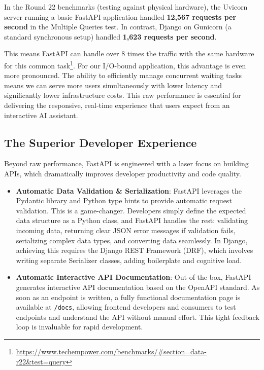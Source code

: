 In the Round 22 benchmarks (testing against physical hardware), the Uvicorn server running a basic FastAPI application handled \textbf{12,567 requests per second} in the Multiple Queries test. In contrast, Django on Gunicorn (a standard synchronous setup) handled \textbf{1,623 requests per second}.

This means FastAPI can handle over 8 times the traffic with the same hardware for this common task\footnote{\url{https://www.techempower.com/benchmarks/#section=data-r22&test=query}}. For our I/O-bound application, this advantage is even more pronounced. The ability to efficiently manage concurrent waiting tasks means we can serve more users simultaneously with lower latency and significantly lower infrastructure costs. This raw performance is essential for delivering the responsive, real-time experience that users expect from an interactive AI assistant.

\subsection{The Superior Developer Experience}
Beyond raw performance, FastAPI is engineered with a laser focus on building APIs, which dramatically improves developer productivity and code quality.

\begin{itemize}
    \item \textbf{Automatic Data Validation \& Serialization}: FastAPI leverages the Pydantic library and Python type hints to provide automatic request validation. This is a game-changer. Developers simply define the expected data structure as a Python class, and FastAPI handles the rest: validating incoming data, returning clear JSON error messages if validation fails, serializing complex data types, and converting data seamlessly. In Django, achieving this requires the Django REST Framework (DRF), which involves writing separate Serializer classes, adding boilerplate and cognitive load.
    \item \textbf{Automatic Interactive API Documentation}: Out of the box, FastAPI generates interactive API documentation based on the OpenAPI standard. As soon as an endpoint is written, a fully functional documentation page is available at \texttt{/docs}, allowing frontend developers and consumers to test endpoints and understand the API without manual effort. This tight feedback loop is invaluable for rapid development.
\end{itemize}

